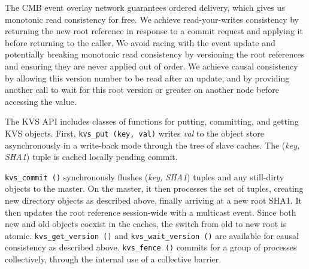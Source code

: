 The CMB event overlay network guarantees ordered delivery, which gives
us monotonic read consistency for free.  We achieve read-your-writes
consistency by returning the new root reference in response to a commit
request and applying it before returning to the caller.  We avoid
racing with the event update and potentially breaking monotonic read
consistency by versioning the root references and ensuring they are
never applied out of order.
We achieve causal consistency by allowing this version number
to be read after an update, and by providing another call to wait for this
root version or greater on another node before accessing the value.

The KVS API includes classes of functions for putting, committing, and
getting KVS objects.  
First, {\tt kvs\_put (key, val)}
writes {\em val} to the object store asynchronously in a write-back
mode through the tree of slave caches.
The ({\em key, SHA1}) tuple is cached locally pending commit.

{\tt kvs\_commit ()} synchronously flushes ({\em key, SHA1}) tuples
and any still-dirty objects to the master.  On the master, it then
processes the set of tuples, creating new directory objects as described
above, finally arriving at a new root SHA1.  It then updates the 
root reference session-wide with a multicast event.
Since both new and old objects coexist in the caches, the switch from old
to new root is atomic.
{\tt kvs\_get\_version ()} and {\tt kvs\_wait\_version ()} are available
for causal consistency as described above.
{\tt kvs\_fence ()} commits for a group of processes collectively,
through the internal use of a collective barrier.


